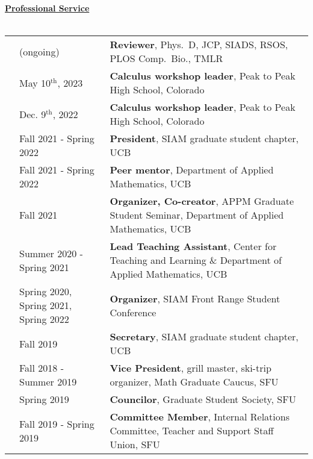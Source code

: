 \documentclass[letterpaper,11pt,oneside]{article}
\newcommand{\headr}[1]{\vspace{10pt}\uline{\Large{\textbf{#1}} \hfill } \\ \vspace{-10pt}\\}
\begin{document}
\headr{Professional Service}
\begin{tabular}{@{} p{0.01cm} p{4.5cm} p{12cm}}
& (ongoing) & {\bf Reviewer}, Phys.\ D, JCP, SIADS, RSOS, PLOS Comp.\ Bio., TMLR\\
& May 10$^\text{th}$, 2023 & {\bf Calculus workshop leader}, Peak to Peak High School, Colorado \\ 
& Dec. 9$^\text{th}$, 2022 & {\bf Calculus workshop leader}, Peak to Peak High School, Colorado \\ 
& Fall 2021 - Spring 2022 & \textbf{President}, SIAM graduate student chapter, UCB\\
& Fall 2021 - Spring 2022  & \textbf{Peer mentor}, Department of Applied Mathematics, UCB\\
& Fall 2021  & \textbf{Organizer, Co-creator}, APPM Graduate Student Seminar, Department of Applied Mathematics, UCB\\
& Summer 2020 - Spring 2021 & \textbf{Lead Teaching Assistant}, Center for Teaching and Learning \& Department of Applied Mathematics, UCB\\
& Spring 2020, Spring 2021, Spring 2022  & \textbf{Organizer}, SIAM Front Range Student Conference \\
& Fall 2019  & \textbf{Secretary}, SIAM graduate student chapter, UCB\\
& Fall 2018 - Summer 2019 & \textbf{Vice President}, grill master, ski-trip organizer, Math Graduate Caucus, SFU\\
& Spring 2019 & \textbf{Councilor}, Graduate Student Society, SFU\\
& Fall 2019 - Spring 2019 & \textbf{Committee Member}, Internal Relations Committee, Teacher and Support Staff Union, SFU \\
\end{tabular}






\end{document}
